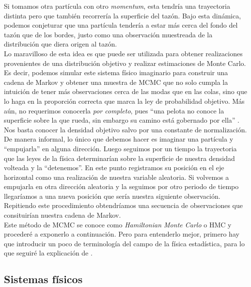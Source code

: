  Si tomamos otra partícula con otro \textit{momentum}, esta tendría una trayectoria distinta pero que también recorrería la superficie del tazón. Bajo esta dinámica, podemos conjeturar que una partícula tendería a estar más cerca del fondo del tazón que de los bordes, justo como una observación muestreada de la distribución que diera origen al tazón.\\ 
 
 Lo maravilloso de esta idea es que puede ser utilizada para obtener realizaciones provenientes de una distribución objetivo y realizar estimaciones de Monte Carlo. Es decir, podemos simular este sistema físico imaginario para construir una cadena de Markov y obtener una muestra de MCMC que no solo cumpla la intuición de tener más observaciones cerca de las modas que en las colas, sino que lo haga en la proporción correcta que marca la ley de probabilidad objetivo. Más aún, no requerimos conocerla \textit{por completo}, pues ``una pelota no conoce la superficie sobre la que rueda, sin embargo su camino está gobernado por ella'' \parencite{McElreath17}. Nos basta conocer la densidad objetivo salvo por una constante de normalización.\\ 
 
 De manera informal, lo único que debemos hacer es imaginar una partícula y ``empujarla'' en alguna dirección. Luego seguimos por un tiempo la trayectoria que las leyes de la física determinarían sobre la superficie de nuestra densidad volteada y la ``detenemos''. En este punto registramos su posición en el eje horizontal como una realización de nuestra variable aleatoria. Si volvemos a empujarla en otra dirección aleatoria y la seguimos por otro periodo de tiempo llegaríamos a una nueva posición que sería nuestra siguiente observación. Repitiendo este procedimiento obtendríamos una secuencia de observaciones que consituirían nuestra cadena de Markov.\\ 
 
 Este método de MCMC se conoce como \textit{Hamiltonian Monte Carlo} o HMC y procederé a exponerlo a continuación. Pero para entenderlo mejor, primero hay que introducir un poco de terminología del campo de la física estadística, para lo que seguiré la explicación de \textcite{Neal93}.\\
 
\subsection{Sistemas físicos} 
 
